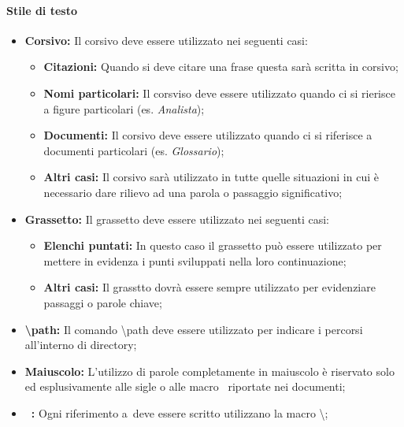       \paragraph{Stile di testo}
        \begin{itemize}
          \item \textbf{Corsivo: }Il corsivo deve essere utilizzato nei seguenti casi:
            \bgroup
              \begin{itemize}
                \item \textbf{Citazioni: }Quando si deve citare una frase questa sarà scritta in corsivo;
                \item \textbf{Nomi particolari: }Il corsviso deve essere utilizzato quando ci si rierisce a figure particolari (es. \emph{Analista});
                \item \textbf{Documenti: }Il corsivo deve essere utilizzato quando ci si riferisce a documenti particolari (es. \emph{Glossario});
                \item \textbf{Altri casi: }Il corsivo sarà utilizzato in tutte quelle situazioni in cui è necessario dare rilievo ad una parola o passaggio
                significativo;
              \end{itemize}
            \egroup
          \item \textbf{Grassetto: }Il grassetto deve essere utilizzato nei seguenti casi:
            \bgroup
              \begin{itemize}
                \item \textbf{Elenchi puntati: }In questo caso il grassetto può essere utilizzato per mettere in evidenza i punti sviluppati nella loro continuazione;
                \item \textbf{Altri casi: }Il grasstto dovrà essere sempre utilizzato per evidenziare passaggi o parole chiave;
              \end{itemize}
            \egroup
          \item \textbf{\textbackslash path: }Il comando \textbackslash path deve essere utilizzato per indicare i percorsi all'interno di directory;
          \item \textbf{Maiuscolo: }L'utilizzo di parole completamente in maiuscolo è riservato solo ed esplusivamente alle sigle o alle macro \glossaryItem{\LaTeX}\ riportate
          nei documenti;
          \item \textbf{\glossaryItem{\LaTeX}\ : }Ogni riferimento a\glossaryItem{\LaTeX}\ deve essere scritto utilizzano la macro \textbackslash \glossaryItem{\LaTeX};
        \end{itemize}
